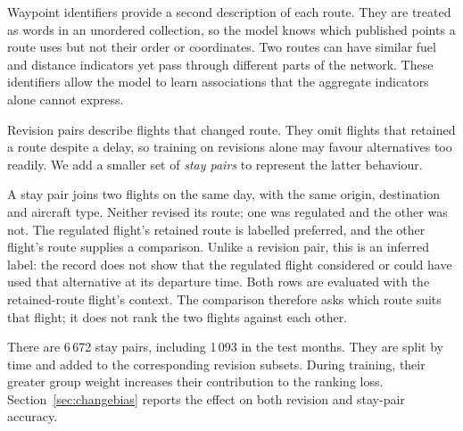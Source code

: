\documentclass[conference,10pt,a4paper,IEEEoverridecommandlockouts]{IEEEtran}
\begin{document}
Waypoint identifiers provide a second description of each route. They
are treated as words in an unordered collection, so the model knows
which published points a route uses but not their order or coordinates.
Two routes can have similar fuel and distance indicators yet pass through
different parts of the network. These identifiers allow the model to
learn associations that the aggregate indicators alone cannot express.

Revision pairs describe flights that changed route. They omit flights
that retained a route despite a delay, so training on revisions alone
may favour alternatives too readily. We add a smaller set of
\emph{stay pairs} to represent the latter behaviour.

A stay pair joins two flights on the same day, with the same origin,
destination and aircraft type. Neither revised its route; one was
regulated and the other was not. The regulated flight's retained route
is labelled preferred, and the other flight's route supplies a comparison.
Unlike a revision pair, this is an inferred label: the record does not
show that the regulated flight considered or could have used that
alternative at its departure time. Both rows are evaluated with the
retained-route flight's context. The comparison therefore asks which
route suits that flight; it does not rank the two flights against each other.

There are 6\,672 stay pairs, including 1\,093 in the test months. They
are split by time and added to the corresponding revision subsets.
During training, their greater group weight increases their contribution
to the ranking loss. Section~\ref{sec:changebias} reports the effect on
both revision and stay-pair accuracy.
\end{document}
